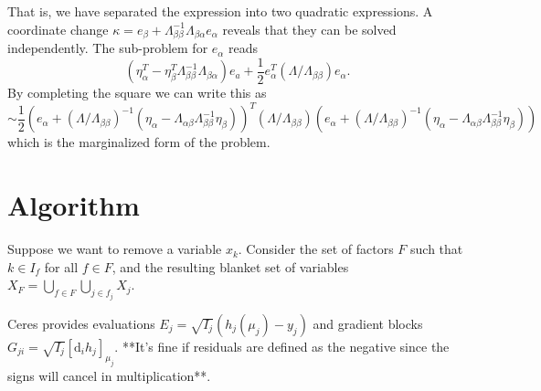 That is, we have separated the expression into two quadratic expressions. A coordinate change $\kappa = e_\beta + \Lambda_{\beta\beta}^{-1} \Lambda_{\beta \alpha} e_\alpha$ reveals that they can be solved independently. The sub-problem for $e_\alpha$ reads
$$
  \left( \eta_\alpha^T - \eta_\beta^T \Lambda_{\beta\beta}^{-1} \Lambda_{\beta \alpha} \right) e_a + \frac{1}{2} e_\alpha^T (\Lambda/\Lambda_{\beta\beta}) e_\alpha.
$$
By completing the square we can write this as
$$
  \sim \frac{1}{2} \left( e_\alpha + (\Lambda/\Lambda_{\beta \beta})^{-1} \left( \eta_\alpha -  \Lambda_{\alpha \beta} \Lambda_{\beta \beta}^{-1} \eta_\beta \right) \right)^T (\Lambda/\Lambda_{\beta \beta})   \left( e_\alpha + (\Lambda/\Lambda_{\beta \beta})^{-1} \left( \eta_\alpha - \Lambda_{\alpha \beta} \Lambda_{\beta \beta}^{-1} \eta_\beta \right) \right)
$$
which is the marginalized form of the problem.

\section{Algorithm}

Suppose we want to remove a variable $x_k$. Consider the set of factors $F$ such that $k \in I_f$ for all $f \in F$, and the resulting blanket set of variables $X_F = \bigcup_{f \in F} \bigcup_{j \in f_j} X_j$.

Ceres provides evaluations $E_j = \sqrt{I_j} (h_j(\mu_j) - y_j)$ and gradient blocks $G_{ji} = \sqrt{I_j} [\mathrm{d}_i h_j]_{\mu_j}$. **It's fine if residuals are defined as the negative since the signs will cancel in multiplication**.

